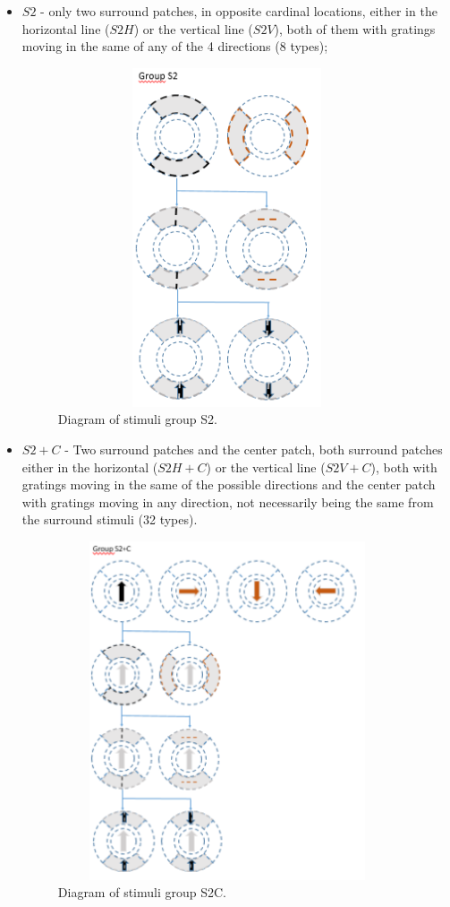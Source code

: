 \begin{itemize}
\item $S2$ - only two surround patches, in opposite cardinal locations, either in the horizontal line ($S2H$) or the vertical line ($S2V$), both of them with gratings moving in the same of any of the 4 directions (8 types);

\begin{figure}[H] \centering \includegraphics[width=10cm,height=10cm,keepaspectratio]{Figures/4.Chapter/S2.PNG} \caption{Diagram of stimuli group S2.} \end{figure}

\item $S2+C$ - Two surround patches and the center patch, both surround patches either in the horizontal ($S2H+C$) or the vertical line ($S2V+C$), both with gratings moving in the same of the possible directions and the center patch with gratings moving in any direction, not necessarily being the same from the surround stimuli (32 types).

\begin{figure}[H] \centering \includegraphics[width=10cm,height=10cm,keepaspectratio]{Figures/4.Chapter/S2C.PNG} \caption{Diagram of stimuli group S2C.} \end{figure}

\end{itemize}


